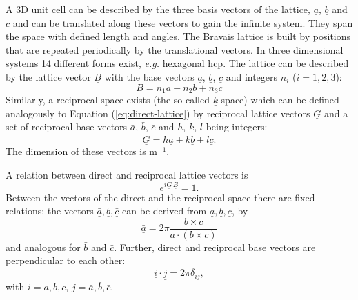 \documentclass[11pt,DIV=13,BCOR=5mm,a4paper,headinclude]{scrbook}
\renewcommand{\vec}[1]{\underline{#1}}
\begin{document}
A 3D unit cell can be described by the three basis vectors of the lattice, $\vec{a}$, $\vec{b}$ and $\vec{c}$ and can be translated along these vectors to gain the infinite system\cite{jensen}.
They span the space with defined length and angles.
The Bravais lattice is built by positions that are repeated periodically by the translational vectors.
In three dimensional systems 14 different forms exist, \textit{e.g.} hexagonal hcp.
The lattice can be described by the lattice vector $\vec{B}$ with the base vectors $\vec{a}$, $\vec{b}$, $\vec{c}$ and integers $n_i$ ($i=1,2,3$):
\begin{equation}\label{eq:direct-lattice}
 \vec{B}=n_1\vec{a}+n_2\vec{b}+n_3\vec{c}
\end{equation}
Similarly, a reciprocal space exists (the so called $\vec{k}$-space) which can be defined analogously to Equation (\ref{eq:direct-lattice}) by reciprocal lattice vectors $\vec{G}$ and a set of reciprocal base vectors $\bar{\vec{a}}$, $\bar{\vec{b}}$, $\bar{\vec{c}}$ and $h$, $k$, $l$ being integers:
\begin{equation}\label{eq:rec_latt_vec}
 \vec{G}=h\bar{\vec{a}}+k\bar{\vec{b}}+l\bar{\vec{c}}.
\end{equation}
The dimension of these vectors is m$^{-1}$.

A relation between direct and reciprocal lattice vectors is
\begin{equation}
 e^{i\vec{G}\,\vec{B}}=1.
\end{equation}
Between the vectors of the direct and the reciprocal space there are fixed relations: the vectors $\bar{\vec{a}},\bar{\vec{b}},\bar{\vec{c}}$  can be derived from $\vec{a},\vec{b},\vec{c}$, by
\begin{equation}
\bar{\vec{a}}=2\pi\frac{\vec{b} \times \vec{c}}{\vec{a}\cdot(\vec{b} \times \vec{c})} 
\end{equation}
and analogous for $\bar{\vec{b}}$ and $\bar{\vec{c}}$.
Further, direct and reciprocal base vectors are perpendicular to each other:
\begin{equation}
 \vec{i}\cdot\bar{\vec{j}}=2\pi\delta_{ij},
\end{equation} 
with $\vec{i}=\vec{a}, \vec{b}, \vec{c}$, $\bar{\vec{j}}=\bar{\vec{a}},\bar{\vec{b}},\bar{\vec{c}}$. %
\end{document}

